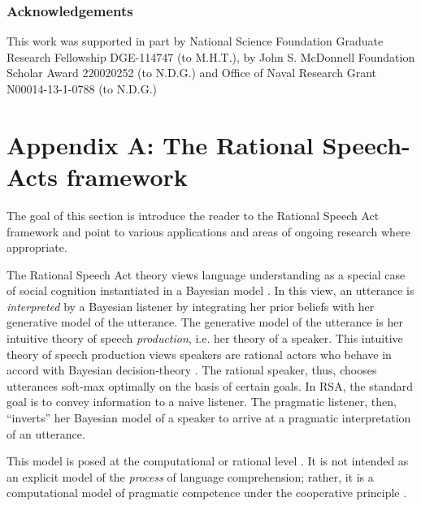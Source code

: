\documentclass[12pt,letterpaper]{article}
\begin{document}
\subsubsection*{Acknowledgements}

This work was supported in part by National Science Foundation Graduate Research Fellowship DGE-114747 (to M.H.T.),
by John S. McDonnell Foundation Scholar Award 220020252 (to N.D.G.) and 
Office of Naval Research Grant N00014-13-1-0788 (to N.D.G.)

\newpage


\setlength{\bibleftmargin}{.125in}
\setlength{\bibindent}{-\bibleftmargin}



\newpage


\section*{Appendix A: The Rational Speech-Acts framework}

The goal of this section is introduce the reader to the Rational Speech Act framework and point to various applications and areas of ongoing research where appropriate.

The Rational Speech Act theory views language understanding as a special case of social cognition instantiated in a Bayesian model \cite{Frank2012, Goodman2013, Goodman2016}. 
In this view, an utterance is \emph{interpreted} by a Bayesian listener by integrating her prior beliefs with her generative model of the utterance.
The generative model of the utterance is her intuitive theory of speech \emph{production}, i.e. her theory of a speaker. 
This intuitive theory of speech production views speakers are rational actors who behave in accord with Bayesian decision-theory \cite{berger1988}.
The rational speaker, thus, chooses utterances soft-max optimally on the basis of certain goals.
In RSA, the standard goal is to convey information to a naive listener. 
The pragmatic listener, then, ``inverts'' her Bayesian model of a speaker to arrive at a pragmatic interpretation of an utterance.

This model is posed at the computational or rational level \cite{Marr1980, Anderson1991}. 
It is not intended as an explicit model of the \emph{process} of language comprehension; rather, it is a computational model of pragmatic competence under the cooperative principle \cite{Grice1975}. 
\end{document}
